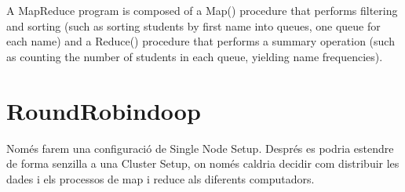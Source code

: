 A MapReduce program is composed of a Map() procedure that performs filtering and sorting (such as sorting students by first name into queues, one queue for each name) and a Reduce() procedure that performs a summary operation (such as counting the number of students in each queue, yielding name frequencies). 









\section{RoundRobindoop}



Només farem una configuració de Single Node Setup. 
Després es podria estendre de forma senzilla a una Cluster Setup, on
només caldria decidir com distribuir les dades i els processos de map
i reduce als diferents computadors.






